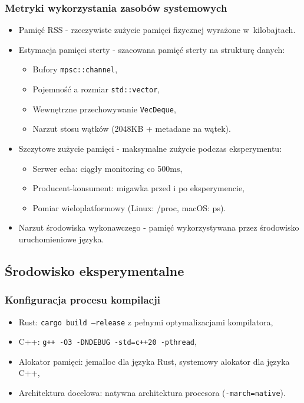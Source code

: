 \subsubsection{Metryki wykorzystania zasobów systemowych}
\begin{itemize}
    \item Pamięć RSS  - rzeczywiste zużycie pamięci fizycznej wyrażone w~kilobajtach.
    \item Estymacja pamięci sterty - szacowana pamięć sterty na strukturę danych:
    \begin{itemize}
        \item Bufory \texttt{mpsc::channel},
        \item Pojemność a rozmiar \texttt{std::vector},
        \item Wewnętrzne przechowywanie \texttt{VecDeque},
        \item Narzut stosu wątków (2048KB + metadane na wątek).
    \end{itemize}
    \item Szczytowe zużycie pamięci - maksymalne zużycie podczas eksperymentu:
    \begin{itemize}
        \item Serwer echa: ciągły monitoring co 500ms,
        \item Producent-konsument: migawka przed i po eksperymencie,
        \item Pomiar wieloplatformowy (Linux: /proc, macOS: ps).
    \end{itemize}
    \item Narzut środowiska wykonawczego - pamięć wykorzystywana przez środowisko uruchomieniowe języka.
\end{itemize}

\subsection{Środowisko eksperymentalne}

\subsubsection{Konfiguracja procesu kompilacji}
\begin{itemize}
    \item Rust: \texttt{cargo build --release} z pełnymi optymalizacjami kompilatora,
    \item C++: \texttt{g++ -O3 -DNDEBUG -std=c++20 -pthread},
    \item Alokator pamięci: jemalloc dla języka Rust, systemowy alokator dla języka C++,
    \item Architektura docelowa: natywna architektura procesora (\texttt{-march=native}).
\end{itemize}

